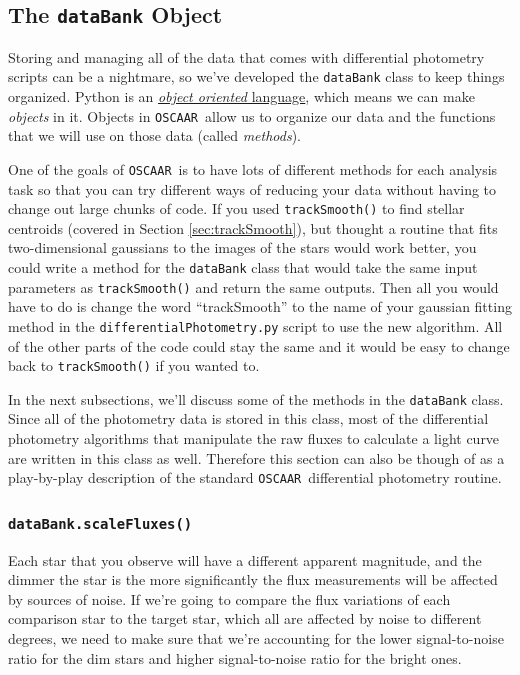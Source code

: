 \documentclass[a4paper]{article}
\newcommand{\code}[1]{\texttt{#1}}
\newcommand{\oscaar}{\code{OSCAAR}~}
\begin{document}
\subsection{The \code{dataBank} Object}
Storing and managing all of the data that comes with differential photometry scripts can be a nightmare, so we've developed the \code{dataBank} class to keep things organized. Python is an \href{https://en.wikipedia.org/wiki/Object-oriented_programming}{\textit{object oriented} language}, which means we can make \textit{objects} in it. Objects in \oscaar allow us to organize our data and the functions that we will use on those data (called \textit{methods}). 

One of the goals of \oscaar is to have lots of different methods for each analysis task so that you can try different ways of reducing your data without having to change out large chunks of code. If you used \code{trackSmooth()} to find stellar centroids (covered in Section \ref{sec:trackSmooth}), but thought a routine that fits two-dimensional gaussians to the images of the stars would work better, you could write a method for the \code{dataBank} class that would take the same input parameters as \code{trackSmooth()} and return the same outputs. Then all you would have to do is change the word ``trackSmooth'' to the name of your gaussian fitting method in the \code{differentialPhotometry.py} script to use the new algorithm. All of the other parts of the code could stay the same and it would be easy to change back to \code{trackSmooth()} if you wanted to. 

In the next subsections, we'll discuss some of the methods in the \code{dataBank} class. Since all of the photometry data is stored in this class, most of the differential photometry algorithms that manipulate the raw fluxes to calculate a light curve are written in this class as well. Therefore this section can also be though of as a play-by-play description of the standard \oscaar differential photometry routine.


\subsubsection{\code{dataBank.scaleFluxes()}}

Each star that you observe will have a different apparent magnitude, and the dimmer the star is the more significantly the flux measurements will be affected by sources of noise. If we're going to compare the flux variations of each comparison star to the target star, which all are affected by noise to different degrees, we need to make sure that we're accounting for the lower signal-to-noise ratio for the dim stars and higher signal-to-noise ratio for the bright ones. 
\end{document}
